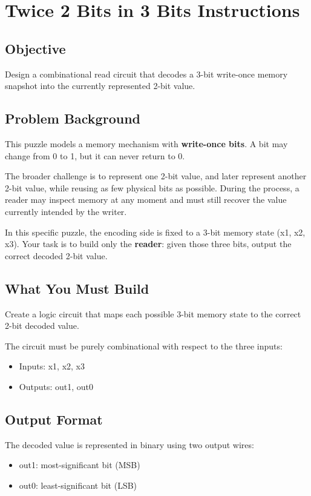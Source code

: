 \section*{Twice 2 Bits in 3 Bits Instructions}

\subsection*{Objective}
Design a combinational read circuit that decodes a 3-bit write-once memory snapshot into the currently represented 2-bit value.

\subsection*{Problem Background}
This puzzle models a memory mechanism with \textbf{write-once bits}. A bit may change from 0 to 1, but it can never return to 0.

The broader challenge is to represent one 2-bit value, and later represent another 2-bit value, while reusing as few physical bits as possible. During the process, a reader may inspect memory at any moment and must still recover the value currently intended by the writer.

In this specific puzzle, the encoding side is fixed to a 3-bit memory state (x1, x2, x3). Your task is to build only the \textbf{reader}: given those three bits, output the correct decoded 2-bit value.

\subsection*{What You Must Build}
Create a logic circuit that maps each possible 3-bit memory state to the correct 2-bit decoded value.

The circuit must be purely combinational with respect to the three inputs:
\begin{itemize}
  \item Inputs: x1, x2, x3
  \item Outputs: out1, out0
\end{itemize}

\subsection*{Output Format}
The decoded value is represented in binary using two output wires:
\begin{itemize}
  \item out1: most-significant bit (MSB)
  \item out0: least-significant bit (LSB)
\end{itemize}

